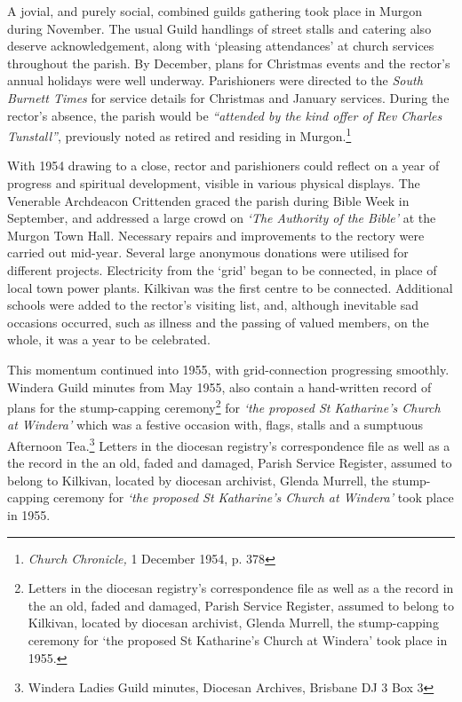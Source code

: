 A jovial, and purely social, combined guilds gathering took place in Murgon during November. The usual Guild handlings of street stalls and catering also deserve acknowledgement, along with `pleasing attendances' at church services throughout the parish. By December, plans for Christmas events and the rector's annual holidays were well underway. Parishioners were directed to the \emph{South Burnett Times} for service details for Christmas and January services. During the rector's absence, the parish would be \emph{``attended by the kind offer of Rev Charles Tunstall''}, previously noted as retired and residing in Murgon.\footnote{\emph{Church Chronicle,} 1 December 1954, p. 378}


With 1954 drawing to a close, rector and parishioners could reflect on a year of progress and spiritual development, visible in various physical displays. The Venerable Archdeacon Crittenden graced the parish during Bible Week in September, and addressed a large crowd on \emph{`The Authority of the Bible'} at the Murgon Town Hall\emph{.} Necessary repairs and improvements to the rectory were carried out mid-year. Several large anonymous donations were utilised for different projects. Electricity from the `grid' began to be connected, in place of local town power plants. Kilkivan was the first centre to be connected. Additional schools were added to the rector's visiting list, and, although inevitable sad occasions occurred, such as illness and the passing of valued members, on the whole, it was a year to be celebrated.



This momentum continued into 1955, with grid-connection progressing smoothly. Windera Guild minutes from May 1955, also contain a hand-written record of plans for the stump-capping ceremony\footnote{Letters in the diocesan registry's correspondence file as well as a the record in the an old, faded and damaged, Parish Service Register, assumed to belong to Kilkivan, located by diocesan archivist, Glenda Murrell, the stump-capping ceremony for `the proposed St Katharine's Church at Windera' took place in 1955.} for \emph{`the proposed St Katharine's Church at Windera'} which was a festive occasion with, flags, stalls and a sumptuous Afternoon Tea.\footnote{Windera Ladies Guild minutes, Diocesan Archives, Brisbane DJ 3 Box 3} Letters in the diocesan registry's correspondence file as well as a the record in the an old, faded and damaged, Parish Service Register, assumed to belong to Kilkivan, located by diocesan archivist, Glenda Murrell, the stump-capping ceremony for \emph{`the proposed St Katharine's Church at Windera'} took place in 1955.








